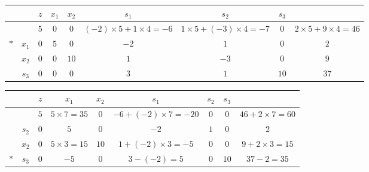 \documentclass[a4paper,12pt]{article}
\begin{document}
\begin{table}[H]
    \tiny
    \begin{tabularx}{\textwidth}{cc|cccccc|c}
            &       & $z$ & $x_1$ & $x_2$ & $s_1$                             & $s_2$                             & $s_3$ &                                \\
        \hline
            &       & $5$ & $0$   & $0$   & $(-2) \times 5 + 1 \times 4 = -6$ & $1 \times 5 + (-3) \times 4 = -7$ & $0$   & $2 \times 5 + 9 \times 4 = 46$ \\
        \hline
        $*$ & $x_1$ & $0$ & $5$   & $0$   & $-2$                              & $1$                               & $0$   & $2$                            \\
            & $x_2$ & $0$ & $0$   & $10$  & $1$                               & $-3$                              & $0$   & $9$                            \\
            & $s_3$ & $0$ & $0$   & $0$   & $3$                               & $1$                               & $10$  & $37$                           \\
    \end{tabularx}
\end{table}

\begin{table}[H]
    \tiny
    \begin{tabularx}{\textwidth}{cc|cccccc|c}
            &       & $z$ & $x_1$             & $x_2$ & $s_1$                      & $s_2$ & $s_3$ &                        \\
        \hline
            &       & $5$ & $5 \times 7 = 35$ & $0$   & $-6 + (-2) \times 7 = -20$ & $0$   & $0$   & $46 + 2 \times 7 = 60$ \\
        \hline
            & $s_2$ & $0$ & $5$               & $0$   & $-2$                       & $1$   & $0$   & $2$                    \\
            & $x_2$ & $0$ & $5 \times 3 = 15$ & $10$  & $1 + (-2) \times 3 = -5$   & $0$   & $0$   & $9 + 2 \times 3 = 15$  \\
        $*$ & $s_3$ & $0$ & $-5$              & $0$   & $3 - (-2) = 5$             & $0$   & $10$  & $37 - 2 = 35$          \\
    \end{tabularx}
\end{table}
\end{document}
